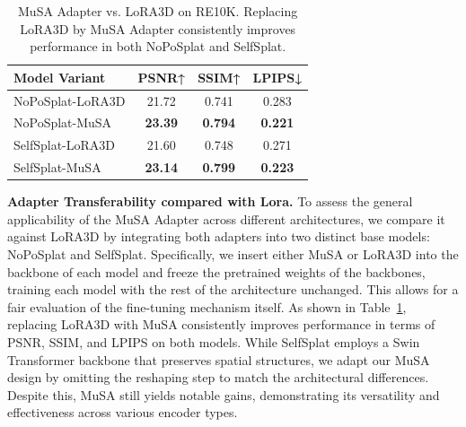 \documentclass[letterpaper]{article} %
\begin{document}
\begin{table}[t]
    \centering
    \caption{Ablation study on MuSA and FFA. Removing either module or using Lora3D instead of our MuSA layer hurts performance. Replacing our aggregator with the memory bank further drastically reduces training efficiency.}
    \label{tab:ablation}
\end{table}
\begin{table}[t]
    \centering
    \begin{tabular}{l|c|c|c}
        \toprule
        Model Variant & PSNR↑ & SSIM↑ & LPIPS↓ \\
        \midrule
        NoPoSplat-LoRA3D & 21.72 & 0.741 & 0.283 \\
        NoPoSplat-MuSA   & \textbf{23.39} & \textbf{0.794} & \textbf{0.221} \\
        \midrule
        SelfSplat-LoRA3D & 21.60 & 0.748 & 0.271 \\
        SelfSplat-MuSA   & \textbf{23.14} & \textbf{0.799} & \textbf{0.223} \\
        \bottomrule
    \end{tabular}
    \caption{MuSA Adapter vs. LoRA3D on RE10K. Replacing LoRA3D by MuSA Adapter consistently improves performance in both NoPoSplat and SelfSplat.}
    \label{tab:adapter_transfer}
\end{table}
\noindent\textbf{Adapter Transferability compared with Lora.} 
To assess the general applicability of the MuSA Adapter across different architectures, we compare it against LoRA3D by integrating both adapters into two distinct base models: NoPoSplat and SelfSplat. Specifically, we insert either MuSA or LoRA3D into the backbone of each model and freeze the pretrained weights of the backbones, training each model with the rest of the architecture unchanged. This allows for a fair evaluation of the fine-tuning mechanism itself. As shown in Table~\ref{tab:adapter_transfer}, replacing LoRA3D with MuSA consistently improves performance in terms of PSNR, SSIM, and LPIPS on both models. While SelfSplat employs a Swin Transformer backbone that preserves spatial structures, we adapt our MuSA design by omitting the reshaping step to match the architectural differences. Despite this, MuSA still yields notable gains, demonstrating its versatility and effectiveness across various encoder types.
\end{document}

